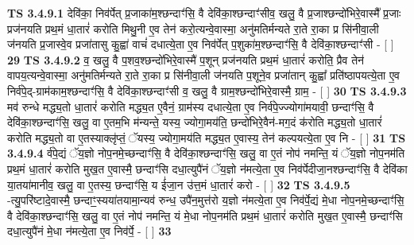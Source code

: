\documentclass[17pt]{extarticle}
\begin{document}
                                        \textbf{ TS 3.4.9.1} \newline
                  देवि॑का॒ निव॑र्पेत् प्र॒जाका॑म॒श्छन्दाꣳ॑सि॒ वै देवि॑का॒श्छन्दाꣳ॑सीव॒ खलु॒ वै प्र॒जाश्छन्दो॑भिरे॒वास्मै᳚ प्र॒जाः प्रज॑नयति प्रथ॒मं धा॒तारं॑ करोति मिथु॒नी ए॒व तेन॑ करो॒त्यन्वे॒वास्मा॒ अनु॑मतिर्मन्यते रा॒ते रा॒का प्र सि॑नीवा॒ली ज॑नयति प्र॒जास्वे॒व प्रजा॑तासु कु॒ह्वा॑ वाचं॑ दधात्ये॒ता ए॒व निव॑र्पेत् प॒शुका॑म॒श्छन्दाꣳ॑सि॒ वै देवि॑का॒श्छन्दाꣳ॑सी - [  ] \textbf{  29} \newline
                  \newline
                                \textbf{ TS 3.4.9.2} \newline
                  व॒ खलु॒ वै प॒शव॒श्छन्दो॑भिरे॒वास्मै॑ प॒शून् प्रज॑नयति प्रथ॒मं धा॒तारं॑ करोति॒ प्रैव तेन॑ वापय॒त्यन्वे॒वास्मा॒ अनु॑मतिर्मन्यते रा॒ते रा॒का प्र सि॑नीवा॒ली ज॑नयति प॒शूने॒व प्रजा॑तान् कु॒ह्वा᳚ प्रति॑ष्ठापयत्ये॒ता ए॒व निर्व॑पे॒द्-ग्राम॑काम॒श्छन्दाꣳ॑सि॒ वै देवि॑का॒श्छन्दाꣳ॑सी व॒ खलु॒ वै ग्राम॒श्छन्दो॑भिरे॒वास्मै॒ ग्राम॒ - [  ] \textbf{  30} \newline
                  \newline
                                \textbf{ TS 3.4.9.3} \newline
                  मव॑ रुन्धे मद्ध्य॒तो धा॒तारं॑ करोति मद्ध्य॒त ए॒वैनं॒ ग्राम॑स्य दधात्ये॒ता ए॒व निर्व॑पे॒ज्ज्योगा॑मयावी॒ छन्दाꣳ॑सि॒ वै देवि॑का॒श्छन्दाꣳ॑सि॒ खलु॒ वा ए॒तम॒भि म॑न्यन्ते॒ यस्य॒ ज्योगा॒मय॑ति॒ छन्दो॑भिरे॒वैन॑-मग॒दं क॑रोति मद्ध्य॒तो धा॒तारं॑ करोति मद्ध्य॒तो वा ए॒तस्याक्लृ॑प्तं॒ ॅयस्य॒ ज्योगा॒मय॑ति मद्ध्य॒त ए॒वास्य॒ तेन॑ कल्पयत्ये॒ता ए॒व नि - [  ] \textbf{  31} \newline
                  \newline
                                \textbf{ TS 3.4.9.4} \newline
                  र्व॑पे॒द्यं ॅय॒ज्ञो नोप॒नमे॒च्छन्दाꣳ॑सि॒ वै देवि॑का॒श्छन्दाꣳ॑सि॒ खलु॒ वा ए॒तं नोप॑ नमन्ति॒ यं ॅय॒ज्ञो नोप॒नम॑ति प्रथ॒मं धा॒तारं॑ करोति मुख॒त ए॒वास्मै॒ छन्दाꣳ॑सि दधा॒त्युपै॑नं ॅय॒ज्ञो न॑मत्ये॒ता ए॒व निव॑र्पेदीजा॒नश्छन्दाꣳ॑सि॒ वै देवि॑का या॒तया॑मानीव॒ खलु॒ वा ए॒तस्य॒ छन्दाꣳ॑सि॒ य ई॑जा॒न उ॑त्त॒मं धा॒तारं॑ करो - [  ] \textbf{  32} \newline
                  \newline
                                \textbf{ TS 3.4.9.5} \newline
                  -त्यु॒परि॑ष्टादे॒वास्मै॒ छन्दाꣳ॒॒स्यया॑तयामा॒न्यव॑ रुन्ध॒ उपै॑न॒मुत्त॑रो य॒ज्ञो न॑मत्ये॒ता ए॒व निव॑र्पे॒द्यं मे॒धा नोप॒नमे॒च्छन्दाꣳ॑सि॒ वै देवि॑का॒श्छन्दाꣳ॑सि॒ खलु॒ वा ए॒तं नोप॑ नमन्ति॒ यं मे॒धा नोप॒नम॑ति प्रथ॒मं धा॒तारं॑ करोति मुख॒त ए॒वास्मै॒ छन्दाꣳ॑सि दधा॒त्युपै॑नं मे॒धा न॑मत्ये॒ता ए॒व निव॑र्पे॒ - [  ] \textbf{  33} \newline
\end{document}
